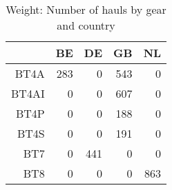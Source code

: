 \begin{table}[ht]
\centering
\begin{tabular}{rrrrr}
  \hline
 & BE & DE & GB & NL \\ 
  \hline
BT4A & 283 & 0 & 543 & 0 \\ 
  BT4AI & 0 & 0 & 607 & 0 \\ 
  BT4P & 0 & 0 & 188 & 0 \\ 
  BT4S & 0 & 0 & 191 & 0 \\ 
  BT7 & 0 & 441 & 0 & 0 \\ 
  BT8 & 0 & 0 & 0 & 863 \\ 
   \hline
\end{tabular}
\caption{Weight: Number of hauls by gear and country} 
\end{table}
